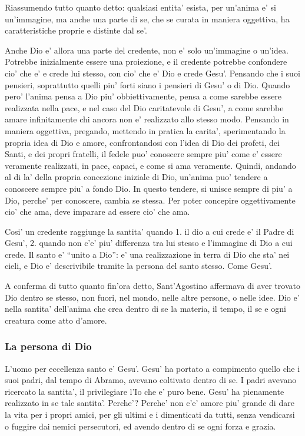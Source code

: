 Riassumendo tutto quanto detto: qualsiasi entita' esista, per un'anima e' si un'immagine, ma anche una parte di se, che se curata in maniera oggettiva, ha caratteristiche proprie e distinte dal se'.

Anche Dio e' allora una parte del credente, non e' solo un'immagine o un'idea. Potrebbe inizialmente essere una proiezione, e il credente potrebbe confondere cio' che e' e crede lui stesso, con cio' che e' Dio e crede Gesu'. Pensando che i suoi pensieri, soprattutto quelli piu' forti siano i pensieri di Gesu' o di Dio.
Quando pero' l'anima pensa a Dio piu' obbiettivamente, pensa a come sarebbe essere realizzata nella pace, e nel caso del Dio caritatevole di Gesu', a come sarebbe amare infinitamente chi ancora non e' realizzato allo stesso modo. Pensando in maniera oggettiva, pregando, mettendo in pratica la carita', sperimentando la propria idea di Dio e amore, confrontandosi con l'idea di Dio dei profeti, dei Santi, e dei propri fratelli, il fedele puo' conoscere sempre piu' come e' essere veramente realizzati, in pace, capaci, e come si ama veramente. Quindi, andando al di la' della propria concezione iniziale di Dio, un'anima puo' tendere a conoscere sempre piu' a fondo Dio. In questo tendere, si unisce sempre di piu' a Dio, perche' per conoscere, cambia se stessa. Per poter concepire oggettivamente cio' che ama, deve imparare ad essere cio' che ama.

Cosi' un credente raggiunge la santita' quando 1. il dio a cui crede e' il Padre di Gesu', 2. quando non c'e' piu' differenza tra lui stesso e l'immagine di Dio a cui crede. Il santo e' ``unito a Dio'': e' una realizzazione in terra di Dio che sta' nei cieli, e Dio e' descrivibile tramite la persona del santo stesso. Come Gesu'. 


A conferma di tutto quanto fin'ora detto, Sant'Agostino affermava di aver trovato Dio dentro se stesso, non fuori, nel mondo, nelle altre persone, o nelle idee. Dio e' nella santita' dell'anima che crea dentro di se la materia, il tempo, il se e ogni creatura come atto d'amore.

\subsubsection{La persona di Dio}

L'uomo per eccellenza santo e' Gesu'. Gesu' ha portato a compimento quello che i suoi padri, dal tempo di Abramo, avevano coltivato dentro di se. I padri avevano ricercato la santita', il privilegiare l'Io che e' puro bene. Gesu' ha pienamente realizzato in se tale santita'. Perche'? Perche' non c'e' amore piu' grande di dare la vita per i propri amici, per gli ultimi e i dimenticati da tutti, senza vendicarsi o fuggire dai nemici persecutori, ed avendo dentro di se ogni forza e grazia.

